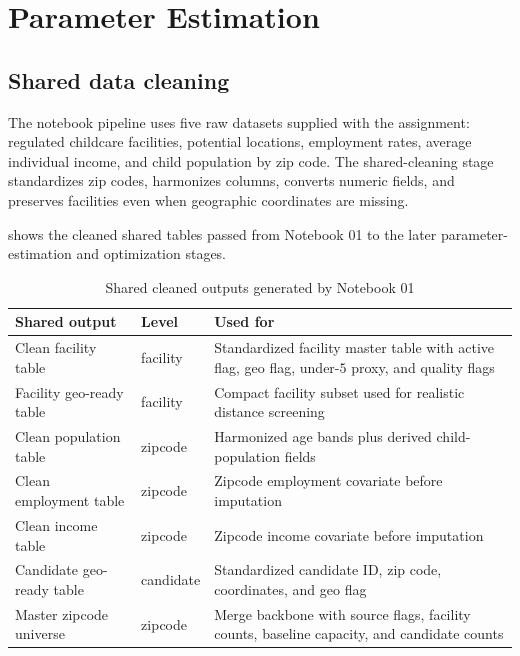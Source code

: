 \documentclass[11pt]{article}
\begin{document}
\section{Parameter Estimation}

\subsection{Shared data cleaning}

The notebook pipeline uses five raw datasets supplied with the assignment: regulated childcare facilities, potential locations, employment rates, average individual income, and child population by zip code. The shared-cleaning stage standardizes zip codes, harmonizes columns, converts numeric fields, and preserves facilities even when geographic coordinates are missing.

 shows the cleaned shared tables passed from Notebook 01 to the later parameter-estimation and optimization stages.

\begin{table}[H]
\centering
\footnotesize
\renewcommand{\arraystretch}{1.08}
\begin{tabularx}{\textwidth}{L{3.8cm}L{1.6cm}Y}
\toprule
\textbf{Shared output} & \textbf{Level} & \textbf{Used for} \\
\midrule
Clean facility table & facility & Standardized facility master table with active flag, geo flag, under-\(5\) proxy, and quality flags \\
Facility geo-ready table & facility & Compact facility subset used for realistic distance screening \\
Clean population table & zipcode & Harmonized age bands plus derived child-population fields \\
Clean employment table & zipcode & Zipcode employment covariate before imputation \\
Clean income table & zipcode & Zipcode income covariate before imputation \\
Candidate geo-ready table & candidate & Standardized candidate ID, zip code, coordinates, and geo flag \\
Master zipcode universe & zipcode & Merge backbone with source flags, facility counts, baseline capacity, and candidate counts \\
\bottomrule
\end{tabularx}
\caption{Shared cleaned outputs generated by Notebook 01}
\label{tab:shared-clean-structure}
\end{table}
\end{document}
